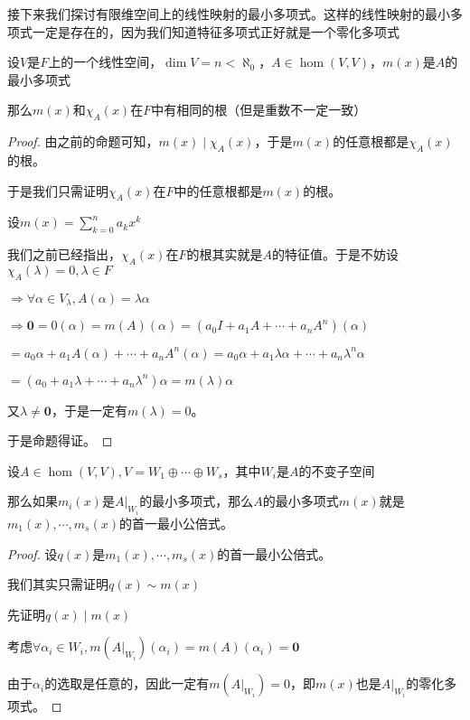 \documentclass[12pt, a4paper, oneside, UTF8]{ctexbook}
\begin{document}
\begin{para}{0}
					接下来我们探讨有限维空间上的线性映射的最小多项式。这样的线性映射的最小多项式一定是存在的，因为我们知道特征多项式正好就是一个零化多项式
					\begin{proposition}
						设$V$是$F$上的一个线性空间，$\dim V = n < \aleph_0$，$A \in \hom(V,V)$，$m(x)$是$A$的最小多项式

						那么$m(x)$和$\chi_A(x)$在$F$中有相同的根（但是重数不一定一致）
					\end{proposition}
					\begin{proof}
						由之前的命题可知，$m(x) \mid \chi_A(x)$，于是$m(x)$的任意根都是$\chi_A(x)$的根。

						于是我们只需证明$\chi_A(x)$在$F$中的任意根都是$m(x)$的根。

						设$m(x)=\sum\limits_{k=0}^{n} a_k x^k$

						我们之前已经指出，$\chi_A(x)$在$F$的根其实就是$A$的特征值。于是不妨设$\chi_A(\lambda )=0,\lambda \in F$

						$\Rightarrow \forall \alpha \in V_\lambda ,A(\alpha )=\lambda \alpha $

						$\Rightarrow \mathbf{0}=0(\alpha )=m(A)(\alpha )=\left(a_0 I+ a_1 A + \cdots + a_n A^n\right)(\alpha )$

						$=a_0 \alpha + a_1 A(\alpha )+\cdots + a_n A^n(\alpha )=a_0 \alpha + a_1 \lambda \alpha +\cdots+a_n \lambda ^n \alpha $

						$=\left(a_0+a_1 \lambda +\cdots + a_n \lambda^n\right)\alpha =m(\lambda )\alpha $

						又$\lambda \neq \mathbf{0}$，于是一定有$m(\lambda )=0$。

						于是命题得证。
					\end{proof}
				\point{}
					\begin{proposition}
						设$A \in \hom(V,V),V = W_1 \oplus \cdots \oplus W_s$，其中$W_i$是$A$的不变子空间

						那么如果$m_i(x)$是$A|_{W_i}$的最小多项式，那么$A$的最小多项式$m(x)$就是$m_1(x),\cdots,m_s(x)$的首一最小公倍式。
					\end{proposition}
					\begin{proof}
						设$q(x)$是$m_1(x),\cdots,m_s(x)$的首一最小公倍式。

						我们其实只需证明$q(x) \sim m(x)$

						先证明$q(x) \mid m(x)$

						考虑$\forall \alpha_i \in W_i,m(A|_{W_i})(\alpha_i)=m(A)(\alpha_i)=\mathbf{0}$

						由于$\alpha_i$的选取是任意的，因此一定有$m(A|_{W_i})=0$，即$m(x)$也是$A|_{W_i}$的零化多项式。


\end{proof}
\end{para}
\end{document}
